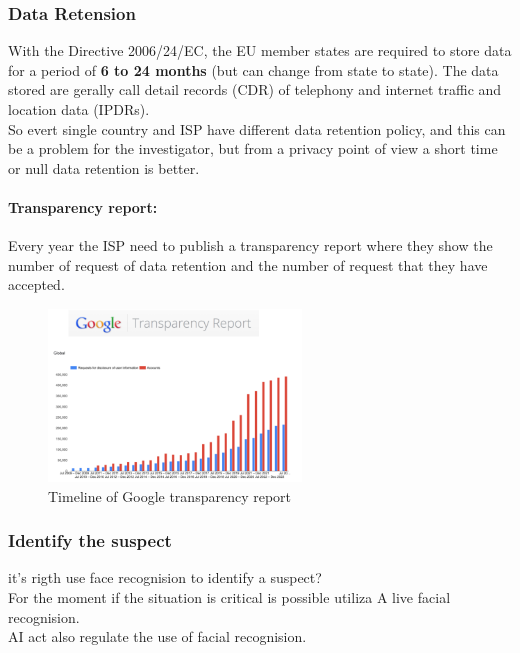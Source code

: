 \subsubsection{Data Retension}
With the Directive 2006/24/EC, the EU member states are required to store data for
a period of \textbf{6 to 24 months} (but can change from state to state).
The data stored are gerally call detail records (CDR) of
telephony and internet traffic and location data (IPDRs). \\
So evert single country and ISP have different data retention policy, and
this can be a problem for the investigator, but from a privacy point of view a short time
or null data retention is better.

\newpage

\paragraph{Transparency report:} Every year the ISP need to publish a transparency report
where they show the number of request of data retention and the number of request that they
have accepted.

\begin{figure}[h!]
  \centering
  \includegraphics[width=0.6\textwidth]{img/transp_report.png}
  \caption{Timeline of Google transparency report}
  \label{fig:transparency report}
\end{figure}

\subsubsection{Identify the suspect}
it's rigth use face recognision to identify a suspect? \\
For the moment if the situation is critical is possible utiliza A
live facial recognision. \\
AI act also regulate the use of facial recognision. %

